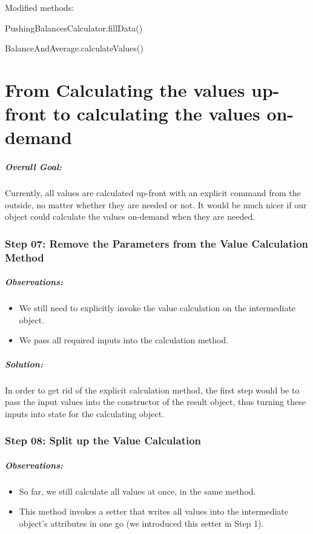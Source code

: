 \documentclass[a4paper,fleqn,titlepage,11pt]{article}
\begin{document}
Modified methods:

PushingBalancesCalculator.fillData()

BalanceAndAverage.calculateValues()

\part{From Calculating the values up-front to calculating the values on-demand}

\subsubsection*{Overall Goal:}

Currently, all values are calculated up-front with an explicit command from the outside, no matter whether they are needed or not. It would be much nicer if our object could calculate the values on-demand when they are needed.


\section*{Step 07: Remove the Parameters from the Value Calculation Method}

\subsubsection*{Observations:}
\begin{itemize}
\item We still need to explicitly invoke the value calculation on the intermediate object. 
\item We pass all required inputs into the calculation method.
\end{itemize}

\subsubsection*{Solution:}

In order to get rid of the explicit calculation method, the first step would be to pass the input values into the constructor of the result object, thus turning these inputs into state for the calculating object.

\section*{Step 08: Split up the Value Calculation}

\subsubsection*{Observations:}
\begin{itemize}
\item So far, we still calculate all values at once, in the same method. 
\item This method invokes a setter that writes all values into the intermediate object's attributes in one go (we introduced this setter in Step 1).
\end{itemize}
\end{document}
